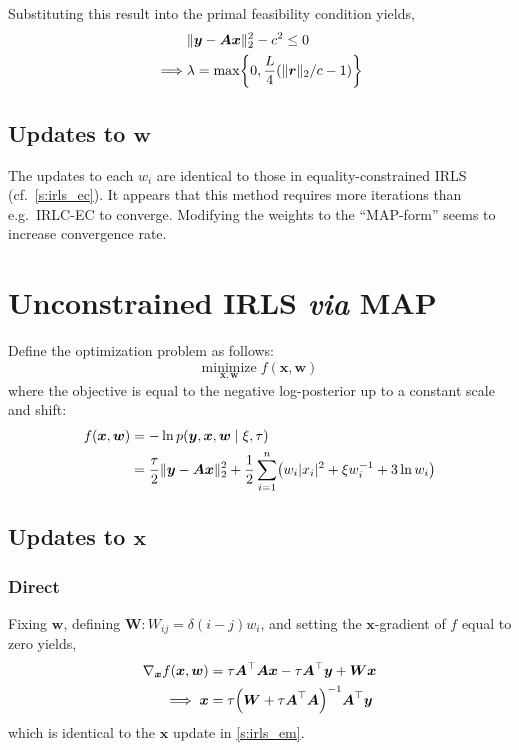 \documentclass{article}
\numberwithin{equation}{section}
\newcommand{\lh}{\mathopen{}\mathclose\bgroup\left}
\newcommand{\rh}{\aftergroup\egroup\right}
\newcommand{\m}[1]{\boldsymbol{#1}}
\begin{document}
Substituting this result into the primal feasibility condition yields,
\begin{equation}
\begin{aligned}
&\| \m{y} - \m{A} \m{x} \|_2^2 - c^2 \le 0
\\ \implies
&\lambda = \max\lh\{
 0, \frac{L}{4} \lh ( \| \m{r} \|_2 / c - 1 \rh) \rh\}
\end{aligned}
\end{equation}

\subsection{Updates to $\m{w}$}
The updates to each $w_i$ are identical to those in equality-constrained
IRLS (cf.~\ref{s:irls_ec}). It appears that this method requires more
iterations than e.g.~IRLC-EC to converge. Modifying the weights to the
``MAP-form'' seems to increase convergence rate.

\clearpage
\section{Unconstrained IRLS \emph{via} MAP}
\label{s:irls_map}
Define the optimization problem as follows:
\begin{equation}
\underset{\m{x}, \m{w}}{\text{minimize}} \; f(\m{x}, \m{w})
\end{equation}
where the objective is equal to the negative log-posterior up to a constant
scale and shift:
\begin{equation}
\begin{aligned}
f(\m{x}, \m{w}) &=
 -\ln p(\m{y}, \m{x}, \m{w} \mid \xi, \tau)
\\ &=
 \frac{\tau}{2} \| \m{y} - \m{A} \m{x} \|_2^2 +
 \frac{1}{2} \sum_{i=1}^n \lh( w_i |x_i|^2 + \xi w_i^{-1} + 3 \ln w_i \rh)
\end{aligned}
\end{equation}

\subsection{Updates to $\m{x}$}
\subsubsection{Direct}
Fixing $\m{w}$, defining $\m{W} : W_{ij} = \delta(i-j) w_i$, and setting
the $\m{x}$-gradient of $f$ equal to zero yields,
\begin{equation}
\begin{aligned}
\nabla_{\m{x}} f(\m{x}, \m{w}) &=
  \tau \m{A}^\top \m{A} \m{x} - \tau \m{A}^\top \m{y} + \m{W} \m{x}
\\ \implies
 \m{x} &= \tau \lh( \m{W} + \tau \m{A}^\top \m{A} \rh)^{-1}
 \m{A}^\top \m{y}
\end{aligned}
\end{equation}
which is identical to the $\m{x}$ update in \ref{s:irls_em}.
\end{document}
